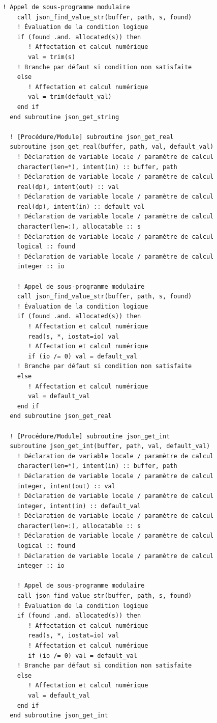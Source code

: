 \documentclass[10pt,a4paper,oneside]{book}
\begin{document}
\begin{lstlisting}[language={[95]Fortran}]
    ! Appel de sous-programme modulaire
    call json_find_value_str(buffer, path, s, found)
    ! Évaluation de la condition logique
    if (found .and. allocated(s)) then
       ! Affectation et calcul numérique
       val = trim(s)
    ! Branche par défaut si condition non satisfaite
    else
       ! Affectation et calcul numérique
       val = trim(default_val)
    end if
  end subroutine json_get_string

  ! [Procédure/Module] subroutine json_get_real
  subroutine json_get_real(buffer, path, val, default_val)
    ! Déclaration de variable locale / paramètre de calcul
    character(len=*), intent(in) :: buffer, path
    ! Déclaration de variable locale / paramètre de calcul
    real(dp), intent(out) :: val
    ! Déclaration de variable locale / paramètre de calcul
    real(dp), intent(in) :: default_val
    ! Déclaration de variable locale / paramètre de calcul
    character(len=:), allocatable :: s
    ! Déclaration de variable locale / paramètre de calcul
    logical :: found
    ! Déclaration de variable locale / paramètre de calcul
    integer :: io

    ! Appel de sous-programme modulaire
    call json_find_value_str(buffer, path, s, found)
    ! Évaluation de la condition logique
    if (found .and. allocated(s)) then
       ! Affectation et calcul numérique
       read(s, *, iostat=io) val
       ! Affectation et calcul numérique
       if (io /= 0) val = default_val
    ! Branche par défaut si condition non satisfaite
    else
       ! Affectation et calcul numérique
       val = default_val
    end if
  end subroutine json_get_real

  ! [Procédure/Module] subroutine json_get_int
  subroutine json_get_int(buffer, path, val, default_val)
    ! Déclaration de variable locale / paramètre de calcul
    character(len=*), intent(in) :: buffer, path
    ! Déclaration de variable locale / paramètre de calcul
    integer, intent(out) :: val
    ! Déclaration de variable locale / paramètre de calcul
    integer, intent(in) :: default_val
    ! Déclaration de variable locale / paramètre de calcul
    character(len=:), allocatable :: s
    ! Déclaration de variable locale / paramètre de calcul
    logical :: found
    ! Déclaration de variable locale / paramètre de calcul
    integer :: io

    ! Appel de sous-programme modulaire
    call json_find_value_str(buffer, path, s, found)
    ! Évaluation de la condition logique
    if (found .and. allocated(s)) then
       ! Affectation et calcul numérique
       read(s, *, iostat=io) val
       ! Affectation et calcul numérique
       if (io /= 0) val = default_val
    ! Branche par défaut si condition non satisfaite
    else
       ! Affectation et calcul numérique
       val = default_val
    end if
  end subroutine json_get_int


\end{lstlisting}
\end{document}
